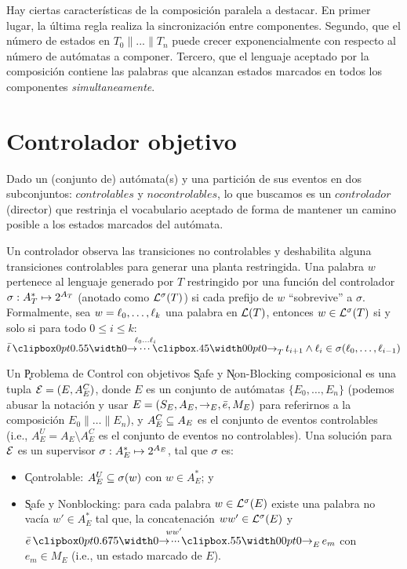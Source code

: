 Hay ciertas características de la composición paralela a destacar. En primer lugar, la última regla realiza la sincronización entre componentes. Segundo, que el número de estados en $T_0 \| ... \| T_n$ puede crecer exponencialmente con respecto al número de autómatas a componer. Tercero, que el lenguaje aceptado por la composición contiene las palabras que alcanzan estados marcados en todos los componentes \textit{simultaneamente}.

\section{Controlador objetivo}

Dado un (conjunto de) autómata(s) y una partición de sus eventos en dos subconjuntos: $controlables$ y $no controlables$, lo que buscamos es un $controlador$ (director) que restrinja el vocabulario aceptado de forma de mantener un camino posible a los estados marcados del autómata.

Un controlador observa las transiciones no controlables y deshabilita alguna transiciones controlables para generar una planta restringida. Una palabra $w$ pertenece al lenguaje generado por $T$ restringido por una función del controlador $\sigma : A_T^* \mapsto 2^{A_T}$ (anotado como $\mathcal{L}^\sigma(T)$) si cada prefijo de $w$ ``sobrevive'' a $\sigma$.
Formalmente, sea $w = \ell_0,\ldots,\ell_k$ una palabra en $\mathcal{L}(T)$, entonces $w \in \mathcal{L}^\sigma(T)$ si y solo si para todo $0 \leq i \leq k$:
$
\init{t} \run{\,\l_0}{\l_i}{T} t_{i+1} \wedge \l_i \in \sigma(\l_0,\ldots,\l_{i-1})
$

\begin{definition} \label{def:control-problem}
	Un \k{Problema de Control} con objetivos \k{Safe} y \k{Non-Blocking} composicional es una tupla $\mathcal{E} = (E, A_E^C)$, donde $E$ es un conjunto de autómatas $\{E_0,\ldots,E_n\}$ (podemos abusar la notación y usar $E = (S_E,A_E,\rightarrow_E,\bar{e},M_E)$ para referirnos a la composición $E_0\|\ldots\|E_n$), y $A_E^C \subseteq A_E$ es el conjunto de eventos controlables (i.e., $A_E^U = A_E \setminus A_E^C$ es el conjunto de eventos no controlables).
	Una solución para $\mathcal{E}$ es un supervisor $\sigma : A_E^* \mapsto 2^{A_E}$, tal que $\sigma$ es:
	\begin{itemize}[itemsep=4pt,topsep=-8pt]
		
		\item \k{Controlable}: $A_E^U \subseteq \sigma(w)$ con $w \in A_E^*$; y
		
		\item \k{Safe y Nonblocking}: para cada palabra $w \in \mathcal{L}^\sigma(E)$ existe una palabra no vacía $w' \in A_E^*$ tal que, la concatenación $ww' \in \mathcal{L}^\sigma(E)$ y $\init{e} \runw{\;ww'}{E} e_m$ con $e_m \in M_E$ (i.e., un estado marcado de $E$).
		
	\end{itemize}
	
\end{definition}

